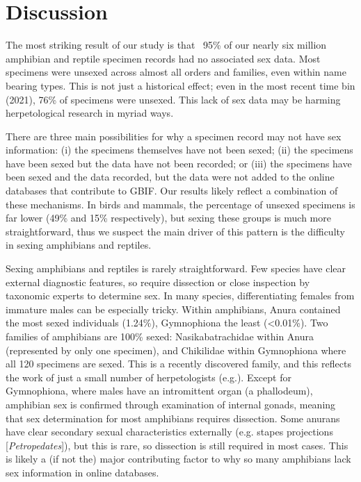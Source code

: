 \documentclass[a4paper, 12pt]{article}
\begin{document}
\section{Discussion}

The most striking result of our study is that ~95\% of our nearly six million amphibian and reptile specimen records had no associated sex data. 
Most specimens were unsexed across almost all orders and families, even within name bearing types. 
This is not just a historical effect; even in the most recent time bin (2021), 76\% of specimens were unsexed. This lack of sex data may be harming herpetological research in myriad ways.

There are three main possibilities for why a specimen record may not have sex information: (i) the specimens themselves have not been sexed; (ii) the specimens have been sexed but the data have not been recorded; or (iii) the specimens have been sexed and the data recorded, but the data were not added to the online databases that contribute to GBIF.  
Our results likely reflect a combination of these mechanisms. 
In birds and mammals, the percentage of unsexed specimens is far lower (49\% and 15\% respectively\cite{cooper2019sex}), but sexing these groups is much more straightforward, thus we suspect the main driver of this pattern is the difficulty in sexing amphibians and reptiles.

Sexing amphibians and reptiles is rarely straightforward. 
Few species have clear external diagnostic features, so require dissection or close inspection by taxonomic experts to determine sex. 
In many species, differentiating females from immature males can be especially tricky. 
Within amphibians, Anura contained the most sexed individuals (1.24\%), Gymnophiona the least (<0.01\%).
Two families of amphibians are 100\% sexed: Nasikabatrachidae within Anura (represented by only one specimen), and Chikilidae within Gymnophiona where all 120 specimens are sexed.
This is a recently discovered family, and this reflects the work of just a small number of herpetologists (e.g.\cite{kamei2012discovery}).
Except for Gymnophiona, where males have an intromittent organ (a phallodeum), amphibian sex is confirmed through examination of internal gonads, meaning that sex determination for most amphibians requires dissection.
Some anurans have clear secondary sexual characteristics externally (e.g. stapes projections [\textit{Petropedates}]), but this is rare, so dissection is still required in most cases. 
This is likely a (if not the) major contributing factor to why so many amphibians lack sex information in online databases.  
\end{document}
